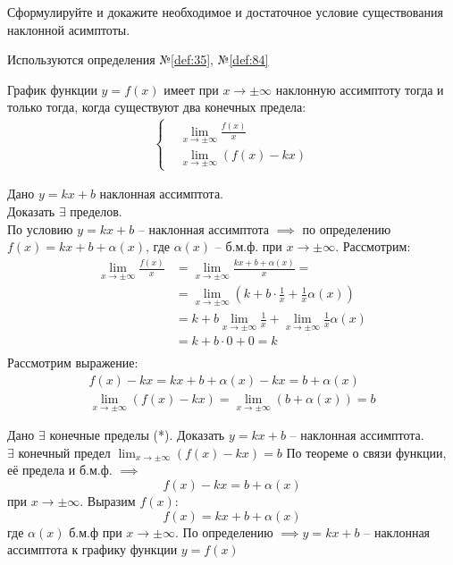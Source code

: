 \begin{question}
    Сформулируйте и докажите необходимое и достаточное условие существования наклонной асимптоты.
\end{question}
\begin{used}
    Используются определения №\ref{def:35}, №\ref{def:84}
\end{used}
\begin{theorem}
    График функции $y = f(x)$ имеет при  $x \to \pm\infty$ наклонную ассимптоту тогда и только тогда, когда существуют два конечных предела:
    \begin{align*}
        \begin{cases}
            &\lim_{x \to \pm\infty} \frac{f(x)}{x} \\
            &\lim_{x \to \pm\infty} (f(x) - kx)
        \end{cases} \tag{*} 
    \end{align*}
\end{theorem}
\begin{necessity}
    Дано $y = kx + b$ наклонная ассимптота. \\
    Доказать  $\exists $ пределов.\\
    По условию $y = kx + b$ -- наклонная ассимптота  $\implies $ по определению $f(x) = kx + b + \alpha(x)$, где $\alpha(x)$ -- б.м.ф. при $x \to  \pm \infty$.
    Рассмотрим:
    \begin{align*}
        \lim_{x \to \pm\infty} \frac{f(x)}{x} &= \lim_{x \to \pm\infty} \frac{kx + b + \alpha(x)}{x} = \\
            &= \lim_{x \to \pm\infty} (k + b \cdot \frac{1}{x} + \frac{1}{x} \alpha(x)) \\
            &= k + b \lim_{x \to \pm\infty} \frac{1}{x} + \lim_{x \to \pm\infty}\frac{1}{x} \alpha(x) \\
            &= k + b\cdot 0 + 0 = k \\
    \end{align*}
    Рассмотрим выражение:
    \begin{align*}
        f(x) - kx = kx + b + \alpha(x) - kx = b + \alpha(x) \\
        \lim_{x \to \pm\infty} (f(x) - kx) = \lim_{x \to \pm\infty} (b + \alpha(x)) = b 
    \end{align*}
\end{necessity}
\begin{sufficiency}
    Дано $\exists $ конечные пределы (*). Доказать $y = kx + b$ -- наклонная ассимптота. \\
    $\exists $ конечный предел $\lim_{x \to \pm\infty} (f(x) - kx) = b$
    По теореме о связи функции, её предела и б.м.ф. $\implies$ \[
        f(x) - kx = b + \alpha(x)
    \]  при $x \to \pm\infty$. Выразим $f(x)$:  \[
        f(x) = kx + b + \alpha(x)
    \] где $\alpha(x)$ б.м.ф при $x \to \pm\infty$.
    По определению $\implies y = kx + b$ -- наклонная ассимптота к графику функции $y = f(x)$
\end{sufficiency}
\pagebreak



